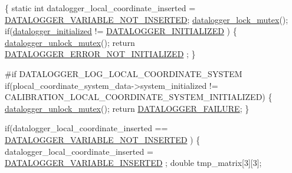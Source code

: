 \begin{DoxyCode}
\{
    \textcolor{keyword}{static} \textcolor{keywordtype}{int} datalogger\_local\_coordinate\_inserted = 
      \hyperlink{datalogger_01_07Caio-PC's_01conflicted_01copy_012012-11-23_08_8h_a1f4fd2dbd981cf35467ab688c9157a74}{DATALOGGER\_VARIABLE\_NOT\_INSERTED};
    \hyperlink{datalogger_01_07Caio-PC's_01conflicted_01copy_012012-11-23_08_8c_a54b06d9395b2e370a5a72beb7f9524b2}{datalogger\_lock\_mutex}();
    \textcolor{keywordflow}{if}(\hyperlink{datalogger_01_07Caio-PC's_01conflicted_01copy_012012-11-23_08_8c_a35e8fbe04b90452afdc3c1be16ff6187}{datalogger\_initialized} != \hyperlink{datalogger_01_07Caio-PC's_01conflicted_01copy_012012-11-23_08_8h_a684c343d340004b77ca2b782934c96ca}{DATALOGGER\_INITIALIZED}
      )
    \{
        \hyperlink{datalogger_01_07Caio-PC's_01conflicted_01copy_012012-11-23_08_8c_a85453211c0c809083c36cc56b275aeeb}{datalogger\_unlock\_mutex}();
        \textcolor{keywordflow}{return} \hyperlink{datalogger_01_07Caio-PC's_01conflicted_01copy_012012-11-23_08_8h_a60df7fe0e61b757ad6a9db106b0eb43e}{DATALOGGER\_ERROR\_NOT\_INITIALIZED}
      ;
    \}

\textcolor{preprocessor}{    #if DATALOGGER\_LOG\_LOCAL\_COORDINATE\_SYSTEM}
\textcolor{preprocessor}{}    \textcolor{keywordflow}{if}(plocal\_coordinate\_system\_data->system\_initialized != 
      CALIBRATION\_LOCAL\_COORDINATE\_SYSTEM\_INITIALIZED)
        \{
        \hyperlink{datalogger_01_07Caio-PC's_01conflicted_01copy_012012-11-23_08_8c_a85453211c0c809083c36cc56b275aeeb}{datalogger\_unlock\_mutex}();
        \textcolor{keywordflow}{return} \hyperlink{datalogger_01_07Caio-PC's_01conflicted_01copy_012012-11-23_08_8h_ac52138ca42979f6e1f1d589020ff9f83}{DATALOGGER\_FAILURE};
        \}

    \textcolor{keywordflow}{if}(datalogger\_local\_coordinate\_inserted == \hyperlink{datalogger_01_07Caio-PC's_01conflicted_01copy_012012-11-23_08_8h_a1f4fd2dbd981cf35467ab688c9157a74}{DATALOGGER\_VARIABLE\_NOT\_INSERTED}
      )
    \{
        datalogger\_local\_coordinate\_inserted = \hyperlink{datalogger_01_07Caio-PC's_01conflicted_01copy_012012-11-23_08_8h_a181f9a0649abd26c74ed1a8a1710e25f}{DATALOGGER\_VARIABLE\_INSERTED}
      ;
        \textcolor{keywordtype}{double} tmp\_matrix[3][3];


\end{DoxyCode}
